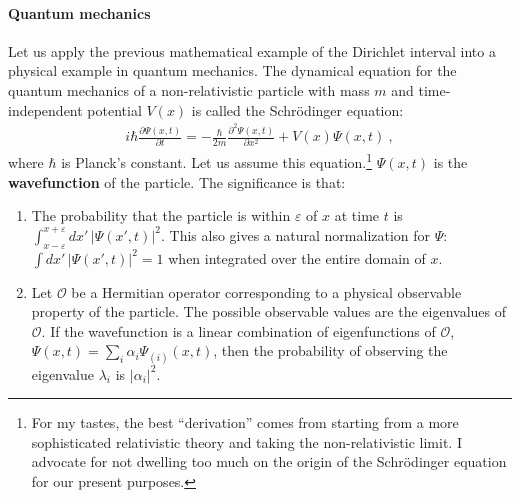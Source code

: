 \documentclass[12pt, oneside]{report}    %
\begin{document}
\paragraph{Quantum mechanics}
Let us apply the previous mathematical example of the Dirichlet interval into a physical example in quantum mechanics. The dynamical equation for the quantum mechanics of a non-relativistic particle with mass $m$ and time-independent potential $V(x)$ is called the Schr\"odinger equation:
\begin{align}
    i\hbar \frac{\partial \Psi(x,t)}{\partial t}
    = -\frac{\hbar}{2m}\frac{\partial^2 \Psi(x,t)}{\partial x^2} + V(x)\Psi(x,t) \ ,
\end{align}
where $\hbar$ is Planck's constant. Let us assume this equation.\footnote{For my tastes, the best ``derivation'' comes from starting from a more sophisticated relativistic theory and taking the non-relativistic limit. I advocate for not dwelling too much on the origin of the Schr\"odinger equation for our present purposes.} $\Psi(x,t)$ is the \textbf{wavefunction} of the particle. The significance is that:
\begin{enumerate}
    \item The probability that the particle is within $\varepsilon$ of $x$ at time $t$ is $\int_{x-\varepsilon}^{x+\varepsilon}dx'\, |\Psi(x',t)|^2$. This also gives a natural normalization for $\Psi$: $\int dx'\,|\Psi(x',t)|^2 = 1$ when integrated over the entire domain of $x$.
    \item Let $\mathcal O$ be a Hermitian operator corresponding to a physical observable property of the particle. The possible observable values are the eigenvalues of $\mathcal O$. If the wavefunction is a linear combination of eigenfunctions of $\mathcal O$, $\Psi(x,t) = \sum_{i}\alpha_i\Psi_{(i)}(x,t)$, then the probability of observing the eigenvalue $\lambda_i$ is $|\alpha_i|^2$. 
\end{enumerate}
\end{document}
